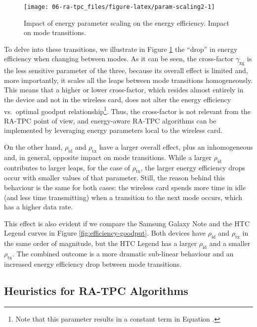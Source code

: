 \documentclass[twoside,nohyper]{tufte-book}
\makeatletter
\let\orig@maketag@@@\maketag@@@
\renewcommand{\eqref}[1]{\textup{\let\maketag@@@\orig@maketag@@@\tagform@{\ref{#1}}}}
\def\maketag@@@#1{\hbox{\rlap{\kern\marginparsep\m@th\normalfont#1}\kern1sp}}
\makeatother
\begin{document}
\begin{figure}

{\centering \texttt{[image: 06-ra-tpc\_files/figure-latex/param-scaling2-1]} 

}

\caption[Impact of energy parameter scaling on the energy efficiency. Impact on mode transitions.]{Impact of energy parameter scaling on the energy efficiency. Impact on mode transitions.}\label{fig:param-scaling2}
\end{figure}

To delve into these transitions, we illustrate in Figure \ref{fig:param-scaling2} the ``drop'' in energy efficiency when changing between modes. As it can be seen, the cross-factor \(\gamma_\mathrm{xg}\) is the less sensitive parameter of the three, because its overall effect is limited and, more importantly, it scales all the leaps between mode transitions homogeneously. This means that a higher or lower cross-factor, which resides almost entirely in the device and not in the wireless card, does not alter the energy efficiency vs.~optimal goodput relationship\footnote{Note that this parameter results in a constant term in Equation \eqref{eq:energyperframe}.}. Thus, the cross-factor is not relevant from the RA-TPC point of view, and energy-aware RA-TPC algorithms can be implemented by leveraging energy parameters local to the wireless card.

On the other hand, \(\rho_\mathrm{id}\) and \(\rho_\mathrm{tx}\) have a larger overall effect, plus an inhomogeneous and, in general, opposite impact on mode transitions. While a larger \(\rho_\mathrm{id}\) contributes to larger leaps, for the case of \(\rho_\mathrm{tx}\), the larger energy efficiency drops occur with smaller values of that parameter. Still, the reason behind this behaviour is the same for both cases: the wireless card spends more time in idle (and less time transmitting) when a transition to the next mode occurs, which has a higher data rate.

This effect is also evident if we compare the Samsung Galaxy Note and the HTC Legend curves in Figure \ref{fig:efficiency-goodput}. Both devices have \(\rho_\mathrm{id}\) and \(\rho_\mathrm{tx}\) in the same order of magnitude, but the HTC Legend has a larger \(\rho_\mathrm{id}\) and a smaller \(\rho_\mathrm{tx}\). The combined outcome is a more dramatic sub-linear behaviour and an increased energy efficiency drop between mode transitions.

\hypertarget{heuristics-for-ra-tpc-algorithms}{%
\subsection{Heuristics for RA-TPC Algorithms}\label{heuristics-for-ra-tpc-algorithms}}
\end{document}
